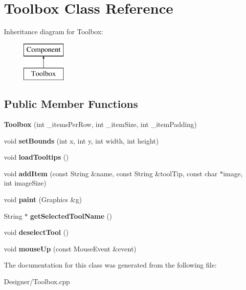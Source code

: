 \hypertarget{class_toolbox}{\section{Toolbox Class Reference}
\label{class_toolbox}
}
Inheritance diagram for Toolbox\-:\begin{figure}[H]
\begin{center}
\leavevmode
\includegraphics[height=2.000000cm]{class_toolbox}
\end{center}
\end{figure}
\subsection*{Public Member Functions}
\begin{DoxyCompactItemize}
\item 
\hypertarget{class_toolbox_a70c729ee9d13e2006dde37d6d3799b5e}{{\bfseries Toolbox} (int \-\_\-items\-Per\-Row, int \-\_\-item\-Size, int \-\_\-item\-Padding)}\label{class_toolbox_a70c729ee9d13e2006dde37d6d3799b5e}

\item 
\hypertarget{class_toolbox_a4670a8e31d3351f9cffdef9afab55f60}{void {\bfseries set\-Bounds} (int x, int y, int width, int height)}\label{class_toolbox_a4670a8e31d3351f9cffdef9afab55f60}

\item 
\hypertarget{class_toolbox_a30371096bc1cd84effacb0e1fb5f7118}{void {\bfseries load\-Tooltips} ()}\label{class_toolbox_a30371096bc1cd84effacb0e1fb5f7118}

\item 
\hypertarget{class_toolbox_a132ff7cc3572441f2d1d79ae92b13d7c}{void {\bfseries add\-Item} (const String \&name, const String \&tool\-Tip, const char $\ast$image, int image\-Size)}\label{class_toolbox_a132ff7cc3572441f2d1d79ae92b13d7c}

\item 
\hypertarget{class_toolbox_a944da05e258adeae77b7ca4e3a45c346}{void {\bfseries paint} (Graphics \&g)}\label{class_toolbox_a944da05e258adeae77b7ca4e3a45c346}

\item 
\hypertarget{class_toolbox_a7a983d8c084a6ba37039cbcce4d4248e}{String $\ast$ {\bfseries get\-Selected\-Tool\-Name} ()}\label{class_toolbox_a7a983d8c084a6ba37039cbcce4d4248e}

\item 
\hypertarget{class_toolbox_a65107fbc493085353192613880d66b5e}{void {\bfseries deselect\-Tool} ()}\label{class_toolbox_a65107fbc493085353192613880d66b5e}

\item 
\hypertarget{class_toolbox_a3fb98eec070a42902f04bce8071f7588}{void {\bfseries mouse\-Up} (const Mouse\-Event \&event)}\label{class_toolbox_a3fb98eec070a42902f04bce8071f7588}

\end{DoxyCompactItemize}


The documentation for this class was generated from the following file\-:\begin{DoxyCompactItemize}
\item 
Designer/Toolbox.\-cpp\end{DoxyCompactItemize}
